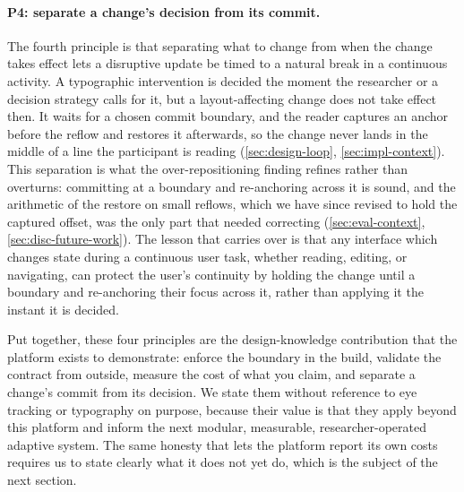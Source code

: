 \paragraph{P4: separate a change's decision from its commit.}
The fourth principle is that separating what to change from when the change takes effect lets a disruptive update be timed to a natural break in a continuous activity.
A typographic intervention is decided the moment the researcher or a decision strategy calls for it, but a layout-affecting change does not take effect then.
It waits for a chosen commit boundary, and the reader captures an anchor before the reflow and restores it afterwards, so the change never lands in the middle of a line the participant is reading (\cref{sec:design-loop}, \cref{sec:impl-context}).
This separation is what the over-repositioning finding refines rather than overturns: committing at a boundary and re-anchoring across it is sound, and the arithmetic of the restore on small reflows, which we have since revised to hold the captured offset, was the only part that needed correcting (\cref{sec:eval-context}, \cref{sec:disc-future-work}).
The lesson that carries over is that any interface which changes state during a continuous user task, whether reading, editing, or navigating, can protect the user's continuity by holding the change until a boundary and re-anchoring their focus across it, rather than applying it the instant it is decided.

Put together, these four principles are the design-knowledge contribution that the platform exists to demonstrate: enforce the boundary in the build, validate the contract from outside, measure the cost of what you claim, and separate a change's commit from its decision.
We state them without reference to eye tracking or typography on purpose, because their value is that they apply beyond this platform and inform the next modular, measurable, researcher-operated adaptive system.
The same honesty that lets the platform report its own costs requires us to state clearly what it does not yet do, which is the subject of the next section.
